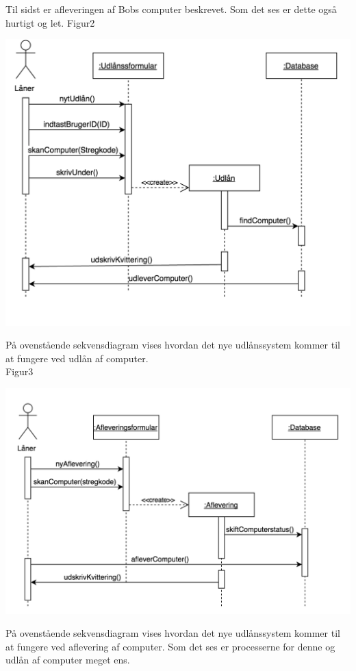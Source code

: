 \documentclass[a4paper]{article}
\begin{document}
Til sidst er afleveringen af Bobs computer beskrevet. Som det ses er dette også hurtigt og let.
\newpage
Figur2\\
\centerline{\includegraphics[scale=0.5]{Sekvensdiagram2.png}}
På ovenstående sekvensdiagram vises hvordan det nye udlånssystem kommer til at fungere ved udlån af computer. \\
Figur3\\
\centerline{\includegraphics[scale=0.5]{Sekvensdiagram3.png}}
På ovenstående sekvensdiagram vises hvordan det nye udlånssystem kommer til at fungere ved aflevering af computer. Som det ses er processerne for denne og udlån af computer meget ens.
\newpage
\end{document}
